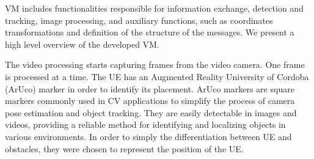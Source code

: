\begin{table}[H]
    \caption{Summary of each message type.}
    \label{tab:message_type}
    \centering
\end{table}

VM includes functionalities responsible for information exchange, detection and tracking, image processing, and auxiliary functions, such as coordinates transformations and definition of the structure of the messages.
We present a high level overview of the developed VM\@.

The video processing starts capturing frames from the video camera.
One frame is processed at a time.
The UE has an Augmented Reality University of Cordoba (ArUco) marker in order to identify its placement.
ArUco markers are square markers commonly used in CV applications to simplify the process of camera pose estimation and object tracking.
They are easily detectable in images and videos, providing a reliable method for identifying and localizing objects in various environments.
In order to simply the differentiation between UE and obstacles, they were chosen to represent the position of the UE\@.


